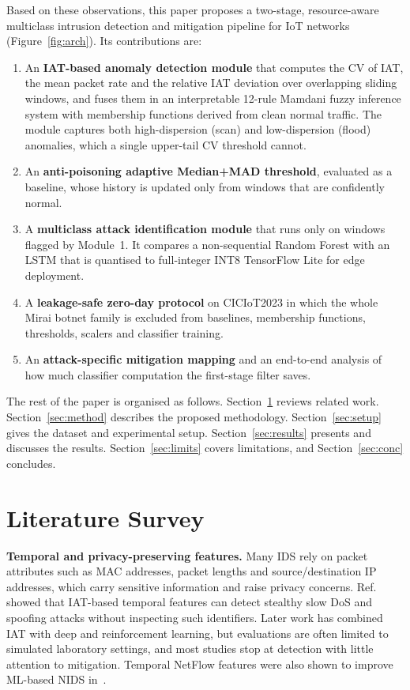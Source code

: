 \documentclass[]{interact}
\theoremstyle{plain}
\theoremstyle{definition}
\begin{document}
Based on these observations, this paper proposes a two-stage, resource-aware multiclass intrusion detection and mitigation pipeline for IoT networks (Figure~\ref{fig:arch}). Its contributions are:
\begin{enumerate}
  \item An \textbf{IAT-based anomaly detection module} that computes the CV of IAT, the mean packet rate and the relative IAT deviation over overlapping sliding windows, and fuses them in an interpretable 12-rule Mamdani fuzzy inference system with membership functions derived from clean normal traffic. The module captures both high-dispersion (scan) and low-dispersion (flood) anomalies, which a single upper-tail CV threshold cannot.
  \item An \textbf{anti-poisoning adaptive Median+MAD threshold}, evaluated as a baseline, whose history is updated only from windows that are confidently normal.
  \item A \textbf{multiclass attack identification module} that runs only on windows flagged by Module~1. It compares a non-sequential Random Forest with an LSTM that is quantised to full-integer INT8 TensorFlow Lite for edge deployment.
  \item A \textbf{leakage-safe zero-day protocol} on CICIoT2023 in which the whole Mirai botnet family is excluded from baselines, membership functions, thresholds, scalers and classifier training.
  \item An \textbf{attack-specific mitigation mapping} and an end-to-end analysis of how much classifier computation the first-stage filter saves.
\end{enumerate}

The rest of the paper is organised as follows. Section~\ref{sec:lit} reviews related work. Section~\ref{sec:method} describes the proposed methodology. Section~\ref{sec:setup} gives the dataset and experimental setup. Section~\ref{sec:results} presents and discusses the results. Section~\ref{sec:limits} covers limitations, and Section~\ref{sec:conc} concludes.

\section{Literature Survey}\label{sec:lit}

\textbf{Temporal and privacy-preserving features.} Many IDS rely on packet attributes such as MAC addresses, packet lengths and source/destination IP addresses, which carry sensitive information and raise privacy concerns. Ref.~\citep{lit_deauth} showed that IAT-based temporal features can detect stealthy slow DoS and spoofing attacks without inspecting such identifiers. Later work has combined IAT with deep and reinforcement learning, but evaluations are often limited to simulated laboratory settings, and most studies stop at detection with little attention to mitigation. Temporal NetFlow features were also shown to improve ML-based NIDS in~\citep{luay2026}.
\end{document}
